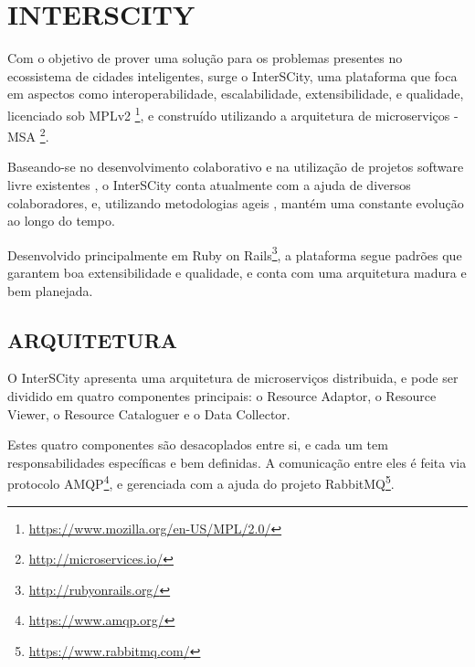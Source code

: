 \chapter[INTERSCITY]{INTERSCITY}

Com o objetivo de prover uma solução para os problemas presentes no ecossistema
de cidades inteligentes, surge o InterSCity, uma plataforma que foca em
aspectos como interoperabilidade, escalabilidade, extensibilidade, e qualidade,
licenciado sob
MPLv2 \footnote{\url{https://www.mozilla.org/en-US/MPL/2.0/}}, e construído
utilizando a arquitetura de microserviços -
MSA \footnote{\url{http://microservices.io/}}.

Baseando-se no desenvolvimento colaborativo e na utilização de projetos software
livre existentes \cite{delesposte2017}, o InterSCity conta atualmente com a
ajuda de diversos colaboradores, e, utilizando metodologias ageis
\cite{delesposte2017}, mantém uma constante evolução ao longo do tempo.

Desenvolvido principalmente em
Ruby on Rails\footnote{\url{http://rubyonrails.org/}},
a plataforma segue padrões que garantem boa extensibilidade e qualidade, e
conta com uma arquitetura madura e bem planejada.

\section{ARQUITETURA}

O InterSCity apresenta uma arquitetura de microserviços distribuida, e pode
ser dividido em quatro componentes principais: o Resource Adaptor, o Resource
Viewer, o Resource Cataloguer e o Data Collector.

Estes quatro componentes são desacoplados entre si, e cada um tem
responsabilidades específicas e bem definidas. A comunicação entre eles é
feita via protocolo AMQP\footnote{\url{https://www.amqp.org/}}, e gerenciada
com a ajuda do projeto RabbitMQ\footnote{\url{https://www.rabbitmq.com/}}. 
